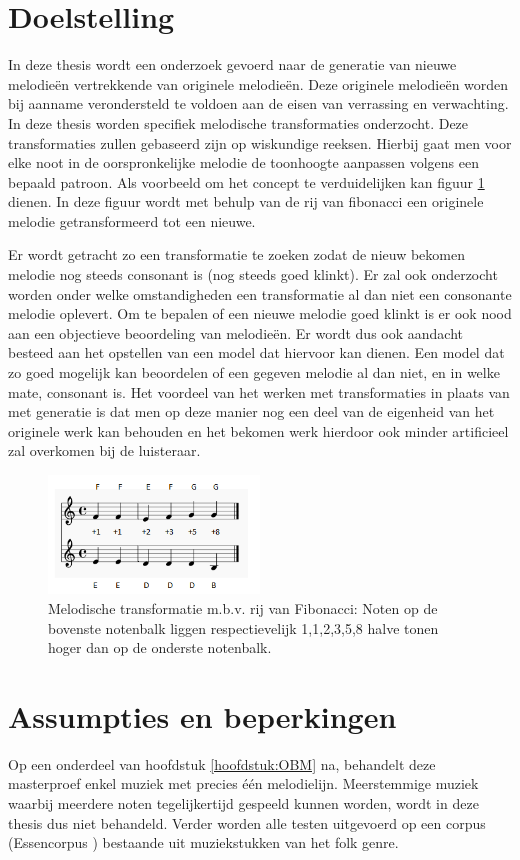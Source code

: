 \section{Doelstelling}
In deze thesis wordt een onderzoek gevoerd naar de generatie van nieuwe melodie\"en vertrekkende van originele melodie\"en. Deze originele melodie\"en worden bij aanname verondersteld te voldoen aan de eisen van verrassing en verwachting. In deze thesis worden specifiek melodische transformaties onderzocht. Deze transformaties zullen gebaseerd zijn op wiskundige reeksen. Hierbij gaat men voor elke noot in de oorspronkelijke melodie de toonhoogte aanpassen volgens een bepaald patroon. Als voorbeeld om het concept te verduidelijken kan figuur \ref{figuur:fibo} dienen. In deze figuur wordt met behulp van de rij van fibonacci een originele melodie getransformeerd tot een nieuwe. 

Er wordt getracht zo een transformatie te zoeken zodat de nieuw bekomen melodie nog steeds consonant is (nog steeds goed klinkt). Er zal ook onderzocht worden onder welke omstandigheden een transformatie al dan niet een consonante melodie oplevert. Om te bepalen of een nieuwe melodie goed klinkt is er ook nood aan een objectieve beoordeling van melodie\"en. Er wordt dus ook aandacht besteed aan het opstellen van een model dat hiervoor kan dienen. Een model dat zo goed mogelijk kan beoordelen of een gegeven melodie al dan niet, en in welke mate, consonant is. Het voordeel van het werken met transformaties in plaats van met generatie is dat men op deze manier nog een deel van de eigenheid van het originele werk kan behouden en het bekomen werk hierdoor ook minder artificieel zal overkomen bij de luisteraar.

\begin{figure}[!ht]
  \centering
  \includegraphics[width=0.5\textwidth]{0_Inleiding/fibo}
  \caption{Melodische transformatie m.b.v. rij van Fibonacci: Noten op de bovenste notenbalk liggen respectievelijk 1,1,2,3,5,8 halve tonen hoger dan op de onderste notenbalk.}
  \label{figuur:fibo}
\end{figure}

\section{Assumpties en beperkingen}
Op een onderdeel van hoofdstuk \ref{hoofdstuk:OBM} na, behandelt deze masterproef enkel muziek met precies \'e\'en melodielijn. Meerstemmige muziek waarbij meerdere noten tegelijkertijd gespeeld kunnen worden, wordt in deze thesis dus niet behandeld. Verder worden alle testen uitgevoerd op een corpus (Essencorpus \cite{url:essen}) bestaande uit muziekstukken van het folk genre.

